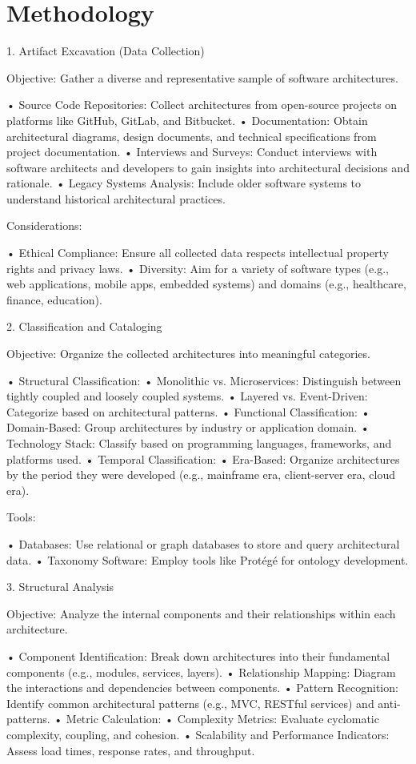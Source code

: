 \chapter{Methodology}

1. Artifact Excavation (Data Collection)

Objective: Gather a diverse and representative sample of software architectures.

	•	Source Code Repositories: Collect architectures from open-source projects on platforms like GitHub, GitLab, and Bitbucket.
	•	Documentation: Obtain architectural diagrams, design documents, and technical specifications from project documentation.
	•	Interviews and Surveys: Conduct interviews with software architects and developers to gain insights into architectural decisions and rationale.
	•	Legacy Systems Analysis: Include older software systems to understand historical architectural practices.

Considerations:

	•	Ethical Compliance: Ensure all collected data respects intellectual property rights and privacy laws.
	•	Diversity: Aim for a variety of software types (e.g., web applications, mobile apps, embedded systems) and domains (e.g., healthcare, finance, education).

2. Classification and Cataloging

Objective: Organize the collected architectures into meaningful categories.

	•	Structural Classification:
	•	Monolithic vs. Microservices: Distinguish between tightly coupled and loosely coupled systems.
	•	Layered vs. Event-Driven: Categorize based on architectural patterns.
	•	Functional Classification:
	•	Domain-Based: Group architectures by industry or application domain.
	•	Technology Stack: Classify based on programming languages, frameworks, and platforms used.
	•	Temporal Classification:
	•	Era-Based: Organize architectures by the period they were developed (e.g., mainframe era, client-server era, cloud era).

Tools:

	•	Databases: Use relational or graph databases to store and query architectural data.
	•	Taxonomy Software: Employ tools like Protégé for ontology development.

3. Structural Analysis

Objective: Analyze the internal components and their relationships within each architecture.

	•	Component Identification: Break down architectures into their fundamental components (e.g., modules, services, layers).
	•	Relationship Mapping: Diagram the interactions and dependencies between components.
	•	Pattern Recognition: Identify common architectural patterns (e.g., MVC, RESTful services) and anti-patterns.
	•	Metric Calculation:
	•	Complexity Metrics: Evaluate cyclomatic complexity, coupling, and cohesion.
	•	Scalability and Performance Indicators: Assess load times, response rates, and throughput.

